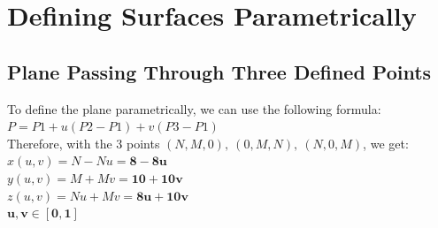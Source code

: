 \documentclass[acmlarge,nonacm=true]{acmart}
\begin{document}
\author{Pang Yu Shao}

\renewcommand{\shortauthors}{Pang Yu Shao}










\tableofcontents
\newpage
\section{Defining Surfaces Parametrically}
\subsection{Plane Passing Through Three Defined Points}
To define the plane parametrically, we can use the following formula: \(P = P1+u(P2-P1)+v(P3-P1)\)\\
Therefore, with the 3 points \((N, M, 0),\ (0, M, N),\ (N, 0, M)\), we get:\\
\(x(u,v) = N - Nu = \mathbf{8 - 8u}\)\\
\(y(u,v) = M + Mv = \mathbf{10 + 10v}\)\\
\(z(u,v) = Nu + Mv = \mathbf{8u + 10v}\)\\
\(\mathbf{u,v \in [0,1]}\)
\end{document}
